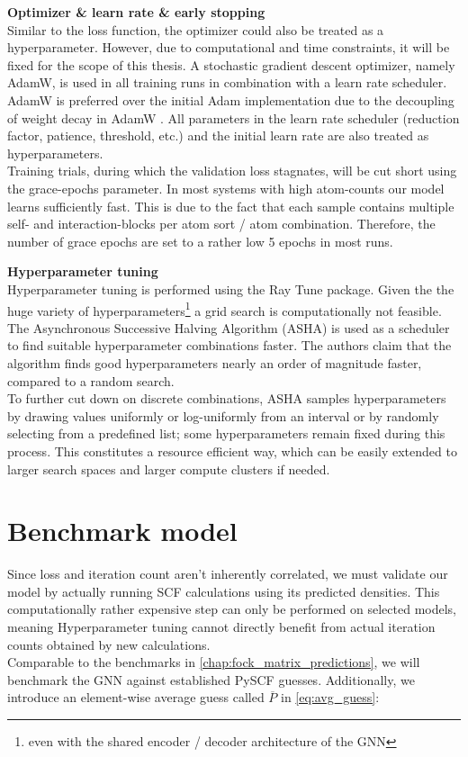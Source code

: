 \textbf{Optimizer \& learn rate \& early stopping}\\
Similar to the loss function, the optimizer could also be treated as a hyperparameter. However, due to computational and time constraints, it will be fixed for the scope of this thesis. A stochastic gradient descent optimizer, namely AdamW, is used in all training runs in combination with a learn rate scheduler. AdamW is preferred over the initial Adam implementation due to the decoupling of weight decay in AdamW \parencite{ref:adamW}. All parameters in the learn rate scheduler (reduction factor, patience, threshold, etc.) and the initial learn rate are also treated as hyperparameters. \\
Training trials, during which the validation loss stagnates, will be cut short using the grace-epochs parameter. In most systems with high atom-counts our model learns sufficiently fast. This is due to the fact that each sample contains multiple self- and interaction-blocks per atom sort / atom combination. Therefore, the number of grace epochs are set to a rather low 5 epochs in most runs. 

\textbf{Hyperparameter tuning}\\
Hyperparameter tuning is performed using the Ray Tune \parencite{ref:ray_tune} package. Given the the huge variety of hyperparameters\footnote{even with the shared encoder / decoder architecture of the GNN} a grid search is computationally not feasible. The Asynchronous Successive Halving Algorithm (ASHA) is used as a scheduler to find suitable hyperparameter combinations faster. The authors claim that the algorithm finds good hyperparameters nearly an order of magnitude faster, compared to a random search. \parencite{ref:ASHA}\\
To further cut down on discrete combinations, ASHA samples hyperparameters by drawing values uniformly or log-uniformly from an interval or by randomly selecting from a predefined list; some hyperparameters remain fixed during this process. This constitutes a resource efficient way, which can be easily extended to larger search spaces and larger compute clusters if needed. 

\section{Benchmark model}
\label{sec:0_d_benchmark_model}
Since loss and iteration count aren't inherently correlated, we must validate our model by actually running SCF calculations using its predicted densities. This computationally rather expensive step can only be performed on selected models, meaning Hyperparameter tuning cannot directly benefit from actual iteration counts obtained by new calculations.\\
Comparable to the benchmarks in \autoref{chap:fock_matrix_predictions}, we will benchmark the GNN against established PySCF guesses. Additionally, we introduce an element-wise average guess called $\overline{P}$ in \autoref{eq:avg_guess}: 

